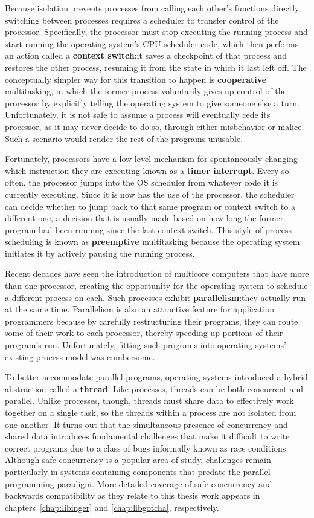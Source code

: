 \documentclass[12pt,letterpaper,openright]{report}
\begin{document}
Because isolation prevents processes from calling each other's functions directly,
switching between processes requires a scheduler to transfer control of the
processor.  Specifically, the processor must stop executing the running process and
start running the operating system's CPU scheduler code, which then performs an
action called a \textbf{context switch}:\@ it saves a checkpoint of that process and
restores the other process, resuming it from the state in which it last left off.
The conceptually simpler way for this transition to happen is \textbf{cooperative}
multitasking, in which the former process voluntarily gives up control of the
processor by explicitly telling the operating system to give someone else a turn.
Unfortunately, it is not safe to assume a process will eventually cede its processor,
as it may never decide to do so, through either misbehavior or malice.  Such a
scenario would render the rest of the programs unusable.

Fortunately, processors have a low-level mechanism for spontaneously changing which
instruction they are executing known as a \textbf{timer interrupt}.  Every so often,
the processor jumps into the OS scheduler from whatever code it is currently
executing.  Since it is now has the use of the processor, the scheduler can decide
whether to jump back to that same program or context switch to a different one, a
decision that is usually made based on how long the former program had been running
since the last context switch.  This style of process scheduling is known as
\textbf{preemptive} multitasking because the operating system initiates it by
actively pausing the running process.

Recent decades have seen the introduction of multicore computers that have more than
one processor, creating the opportunity for the operating system to schedule a
different process on each.  Such processes exhibit \textbf{parallelism}:\@ they
actually run at the same time.  Parallelism is also an attractive feature for
application programmers because by carefully restructuring their programs, they can
route some of their work to each processor, thereby speeding up portions of their
program's run.  Unfortunately, fitting such programs into operating systems' existing
process model was cumbersome.

To better accommodate parallel programs, operating systems introduced a hybrid
abstraction called a \textbf{thread}.  Like processes, threads can be both concurrent
and parallel.  Unlike processes, though, threads must share data to effectively
work together on a single task, so the threads within a process are not isolated from
one another.  It turns out that the simultaneous presence of concurrency and shared
data introduces fundamental challenges that make it difficult to write correct
programs due to a class of bugs informally known as race conditions.  Although safe
concurrency is a popular area of study, challenges remain particularly in systems
containing components that predate the parallel programming paradigm.  More detailed
coverage of safe concurrency and backwards compatibility as they relate to this
thesis work appears in chapters~\ref{chap:libinger} and \ref{chap:libgotcha},
respectively.
\end{document}
